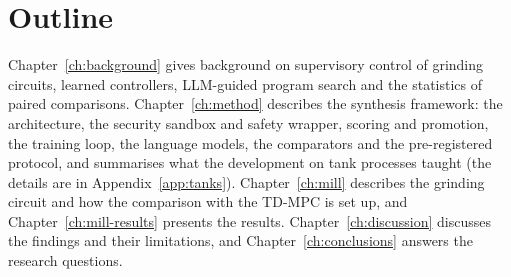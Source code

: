 \section{Outline}
\label{sec:outline}
Chapter~\ref{ch:background} gives background on supervisory control of
grinding circuits, learned controllers, LLM-guided program search and the
statistics of paired comparisons. Chapter~\ref{ch:method} describes the
synthesis framework: the architecture, the security sandbox and safety
wrapper, scoring and promotion, the training loop, the language models, the
comparators and the pre-registered protocol, and summarises what the
development on tank processes taught (the details are in
Appendix~\ref{app:tanks}). Chapter~\ref{ch:mill} describes the grinding
circuit and how the comparison with the TD-MPC is set up, and
Chapter~\ref{ch:mill-results} presents the results. Chapter~\ref{ch:discussion} discusses the findings and
their limitations, and Chapter~\ref{ch:conclusions} answers the research
questions.
